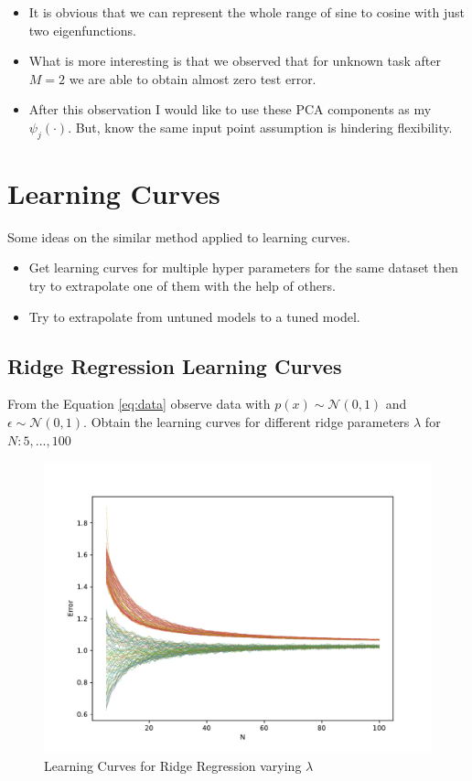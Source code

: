 \documentclass{tran-l}
\theoremstyle{definition}
\theoremstyle{remark}
\numberwithin{equation}{section}
\begin{document}
\begin{itemize}
  \item It is obvious that we can represent the whole range of sine to cosine with just two eigenfunctions. 
  \item What is more interesting is that we observed that for unknown task after $M=2$ we are able to obtain almost zero test error.
  \item After this observation I would like to use these PCA components as my $\psi_j(\cdot)$. But, know the same input point assumption is hindering flexibility.
\end{itemize}

\color{red}
\section{Learning Curves}

Some ideas on the similar method applied to learning curves.
\begin{itemize}
  \item Get learning curves for multiple hyper parameters for the same dataset then try to extrapolate one of them with the help of others.
  \item Try to extrapolate from untuned models to a tuned model.
\end{itemize}

\subsection{Ridge Regression Learning Curves}

From the Equation \ref{eq:data} observe data with $p(x)\sim\mathcal{N}(0,1)$ and $\epsilon\sim\mathcal{N}(0,1)$. Obtain the learning curves for different ridge parameters $\lambda$ for $N:{5,...,100}$

\begin{figure}[h!]
   \centering
   \includegraphics[width=\textwidth]{Figures/initial_study/lr_learning_curves.pdf}
   \caption{Learning Curves for Ridge Regression varying $\lambda$}
\end{figure}
\end{document}
